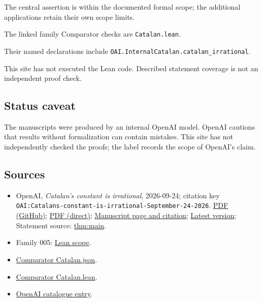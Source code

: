 \documentclass[11pt]{article}
\begin{document}
The central assertion is within the documented formal scope; the additional applications retain their own scope limits.

The linked family Comparator checks are \texttt{Catalan.lean}.

Their named declarations include \texttt{OAI.InternalCatalan.catalan\_irrational}.

This site has not executed the Lean code. Described statement coverage is not an independent proof check.

\subsection{Status caveat}
The manuscripts were produced by an internal OpenAI model. OpenAI cautions that results without formalization can contain mistakes. This site has not independently checked the proofs; the label records the scope of OpenAI's claim.

\subsection{Sources}
\begin{itemize}
\item OpenAI, \emph{Catalan's constant is irrational}, 2026-09-24; citation key \texttt{OAI:Catalans-constant-is-irrational-September-24-2026}. \href{https://github.com/openai/math/blob/adc7f1241b42e322a6451854ab7e4b4c146bf78a/preprints/Catalans-constant-is-irrational-September-24-2026/paper.pdf}{PDF (GitHub)}; \href{https://github.com/openai/math/raw/adc7f1241b42e322a6451854ab7e4b4c146bf78a/preprints/Catalans-constant-is-irrational-September-24-2026/paper.pdf}{PDF (direct)}; \href{https://github.com/openai/math/blob/adc7f1241b42e322a6451854ab7e4b4c146bf78a/preprints/Catalans-constant-is-irrational-September-24-2026/README.md}{Manuscript page and citation}; \href{https://github.com/openai/math/blob/main/preprints/Catalans-constant-is-irrational-September-24-2026/paper.pdf}{Latest version}; Statement source: \href{https://github.com/openai/math/blob/adc7f1241b42e322a6451854ab7e4b4c146bf78a/preprints/Catalans-constant-is-irrational-September-24-2026/build/sections/introduction.tex\#L16}{thm:main}.
\item Family 005: \href{https://github.com/openai/math/blob/adc7f1241b42e322a6451854ab7e4b4c146bf78a/lean/docs/005.md}{Lean scope}.
\item \href{https://github.com/openai/math/blob/adc7f1241b42e322a6451854ab7e4b4c146bf78a/lean/ComparatorChallenges/Catalan.json}{Comparator Catalan.json}.
\item \href{https://github.com/openai/math/blob/adc7f1241b42e322a6451854ab7e4b4c146bf78a/lean/ComparatorChallenges/Catalan.lean}{Comparator Catalan.lean}.
\item \href{https://github.com/openai/math/blob/adc7f1241b42e322a6451854ab7e4b4c146bf78a/CONTENTS.md}{OpenAI catalogue entry}.
\end{itemize}
\end{document}
